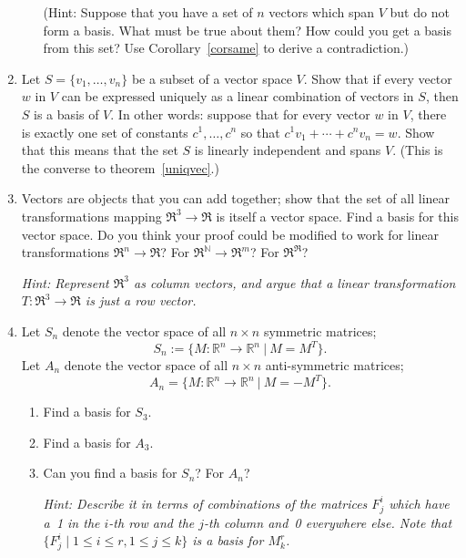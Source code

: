 \begin{enumerate}
\begin{enumerate}
(Hint: Suppose that you have a set of \(n\) vectors which span \(V\) but do not form a basis. What must be true about them? How could you get a basis from this set? Use Corollary~\ref{corsame} to derive a contradiction.)
\end{enumerate}


\item Let $S=\{v_1, \ldots, v_n\}$ be a subset of a vector space $V$.  Show that if every vector $w$ in $V$ can be expressed uniquely as a linear combination of vectors in $S$, then $S$ is a basis of $V$. In other words: suppose that for every vector \(w\) in \(V\), there is exactly one set of constants \(c^1, \ldots, c^n\) so that \(c^1v_1+\cdots+c^nv_n=w\). Show that this means that the set \(S\) is linearly independent and spans \(V\). (This is the converse to theorem~\ref{uniqvec}.)


\item Vectors are objects that you can add together; show that the set of all linear transformations mapping 
$\Re^3\rightarrow \Re$ is itself a vector space.  Find a basis for this vector space.  Do you think your proof could be modified to work for linear transformations $\Re^n\rightarrow \Re$? For $\Re^{\mathbb{N}}\rightarrow \Re^m$? For $\Re^\Re$?

\emph{Hint: Represent $\Re^3$ as column vectors, and argue that a linear transformation $T \colon \Re^3\rightarrow \Re$ is just a row vector. 
}


\item Let $S_n$ denote the vector space of all $n \times n$ symmetric matrices;  $$S_n:=\{M:\mathbb{R}^n\to \mathbb{R}^n ~ |~ M = M^T\}.$$ Let $A_n$ denote the vector space of all $n \times n$ anti-symmetric matrices; 
$$A_n=\{M:\mathbb{R}^n\to \mathbb{R}^n ~ |~ M = -M^T\}.$$
\begin{enumerate}
\item Find a basis for $S_3$.

\item Find a basis for $A_3$.

\item %
Can you find a basis for $S_n$? For $A_n$?

\emph{Hint: Describe it in terms of combinations of the matrices $F^i_j$ which have a~1 in the $i$-th row and the $j$-th column and~0 everywhere else. Note that $\{F^i_j \mid 1 \leq i \leq r, 1 \leq j \leq k\}$ is a basis for $M^r_k$.}
\end{enumerate}


\end{enumerate}
